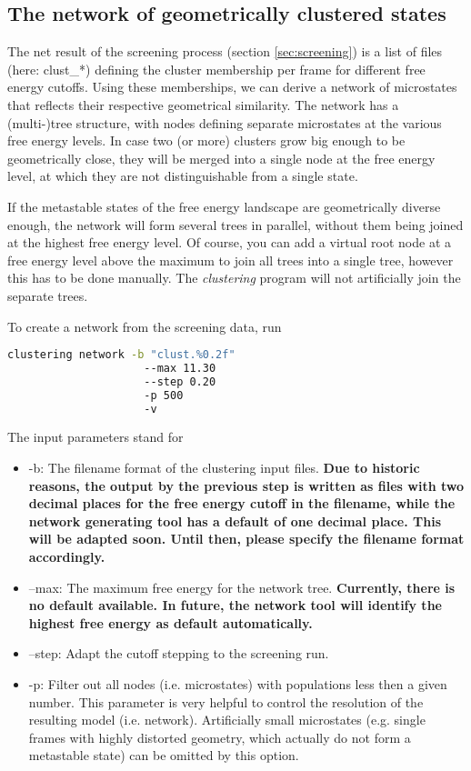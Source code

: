 \documentclass[12pt,a4paper,twoside,english,fleqn]{article}
\begin{document}
\subsection{The network of geometrically clustered states\label{sec:network_generation}}
The net result of the screening process (section \ref{sec:screening}) is a list of files (here: clust\_*) defining the cluster membership
per frame for different free energy cutoffs.
Using these memberships, we can derive a network of microstates that reflects their respective geometrical similarity.
The network has a (multi-)tree structure, with nodes defining separate microstates at the various free energy levels.
In case two (or more) clusters grow big enough to be geometrically close, they will be merged into a single node at the
free energy level, at which they are not distinguishable from a single state.

If the metastable states of the free energy landscape are geometrically diverse enough, the network will form several trees in parallel,
without them being joined at the highest free energy level.
Of course, you can add a virtual root node at a free energy level above the maximum to join all trees into a single tree,
however this has to be done manually.
The \emph{clustering} program will not artificially join the separate trees.

To create a network from the screening data, run
\begin{lstlisting}[language=bash,basicstyle=\ttfamily]
  clustering network -b "clust.%0.2f"
                     --max 11.30
                     --step 0.20
                     -p 500
                     -v
\end{lstlisting}
The input parameters stand for
\begin{itemize}
  \item -b: The filename format of the clustering input files.
            \textbf{Due to historic reasons, the output by the previous step
                    is written as files with two decimal places for the free energy
                    cutoff in the filename, while the network generating tool has a
                    default of one decimal place. This will be adapted soon.
                    Until then, please specify the filename format accordingly.}
  \item --max: The maximum free energy for the network tree.
               \textbf{Currently, there is no default available. In future, the network
                       tool will identify the highest free energy as default automatically.}
  \item --step: Adapt the cutoff stepping to the screening run.
  \item -p: Filter out all nodes (i.e. microstates) with populations less then a given number.
            This parameter is very helpful to control the resolution of the resulting model (i.e. network).
            Artificially small microstates (e.g. single frames with highly distorted geometry, which actually
            do not form a metastable state) can be omitted by this option.
\end{itemize}
\end{document}
